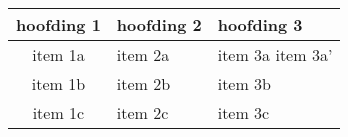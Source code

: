 \begin{tabular}{clp{}}
  \toprule
  hoofding 1 & hoofding 2 & hoofding 3 \\\midrule
  item 1a & item 2a & item 3a \newline item 3a' \\
  item 1b & item 2b & item 3b \\
  item 1c & item 2c & item 3c \\
  \bottomrule
\end{tabular}
